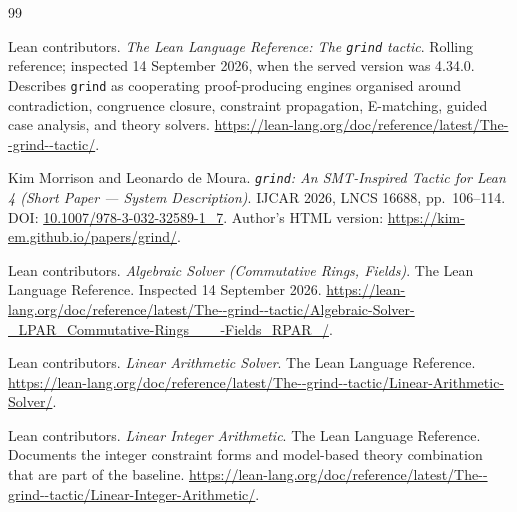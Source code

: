 %
\begin{thebibliography}{99}
\small
\setlength{\itemsep}{3pt}
\setlength{\parskip}{0pt}


Lean contributors. \emph{The Lean Language Reference: The \texttt{grind} tactic}.
Rolling reference; inspected 14 September 2026, when the served version was
4.34.0. Describes \texttt{grind} as cooperating proof-producing engines
organised around contradiction, congruence closure, constraint propagation,
E-matching, guided case analysis, and theory solvers.
\url{https://lean-lang.org/doc/reference/latest/The--grind--tactic/}.

Kim Morrison and Leonardo de Moura.
\emph{\texttt{grind}: An SMT-Inspired Tactic for Lean 4 (Short Paper ---
System Description)}. IJCAR 2026, LNCS 16688, pp.~106--114.
DOI: \href{https://doi.org/10.1007/978-3-032-32589-1_7}{10.1007/978-3-032-32589-1\_7}.
Author's HTML version: \url{https://kim-em.github.io/papers/grind/}.

Lean contributors. \emph{Algebraic Solver (Commutative Rings, Fields)}.
The Lean Language Reference. Inspected 14 September 2026.
\url{https://lean-lang.org/doc/reference/latest/The--grind--tactic/Algebraic-Solver-_LPAR_Commutative-Rings___-Fields_RPAR_/}.

Lean contributors. \emph{Linear Arithmetic Solver}. The Lean Language Reference.
\url{https://lean-lang.org/doc/reference/latest/The--grind--tactic/Linear-Arithmetic-Solver/}.

Lean contributors. \emph{Linear Integer Arithmetic}. The Lean Language
Reference. Documents the integer constraint forms and model-based theory
combination that are part of the baseline.
\url{https://lean-lang.org/doc/reference/latest/The--grind--tactic/Linear-Integer-Arithmetic/}.


\end{thebibliography}
